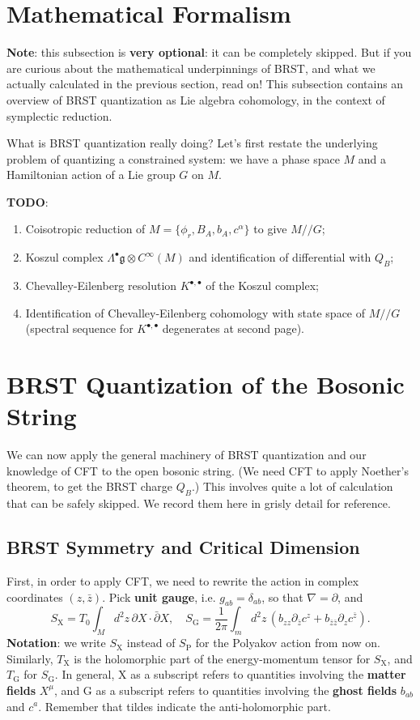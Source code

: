 \documentclass{report}
\theoremstyle{plain}
\theoremstyle{definition}
\theoremstyle{remark}
\newcommand{\di}{\partial}
\newcommand{\fg}{\mathfrak{g}}
\newcommand{\bz}{\bar{z}}
\begin{document}
\section{Mathematical Formalism}

{\bf Note}: this subsection is {\bf very optional}: it can be
completely skipped. But if you are curious about the mathematical
underpinnings of BRST, and what we actually calculated in the previous
section, read on! This subsection contains an overview of BRST
quantization as Lie algebra cohomology, in the context of symplectic
reduction.

What is BRST quantization really doing? Let's first restate the
underlying problem of quantizing a constrained system: we have a phase
space $M$ and a Hamiltonian action of a Lie group $G$ on $M$.

{\color{blue} \bf TODO}:
\begin{enumerate}
\item Coisotropic reduction of $M = \{\phi_r, B_A, b_A, c^\alpha\}$ to
  give $M//G$;
\item Koszul complex $\Lambda^\bullet \fg \otimes C^\infty(M)$ and
  identification of differential with $Q_B$;
\item Chevalley-Eilenberg resolution $K^{\bullet,\bullet}$ of the
  Koszul complex;
\item Identification of Chevalley-Eilenberg cohomology with state
  space of $M//G$ (spectral sequence for $K^{\bullet,\bullet}$
  degenerates at second page).
\end{enumerate}

\section{BRST Quantization of the Bosonic String}

We can now apply the general machinery of BRST quantization and our
knowledge of CFT to the open bosonic string. (We need CFT to apply
Noether's theorem, to get the BRST charge $Q_B$.) This involves quite
a lot of calculation that can be safely skipped. We record them here
in grisly detail for reference.

\subsection{BRST Symmetry and Critical Dimension}

First, in order to apply CFT, we need to rewrite the action in complex
coordinates $(z, \bz)$. Pick {\bf unit gauge}, i.e. $g_{ab} =
\delta_{ab}$, so that $\nabla = \di$, and
\[ S_{\text{X}} = T_0 \int_M d^2z \, \di X \cdot \bar{\di} X, \quad S_{\text{G}} = \frac{1}{2\pi} \int_m d^2z \, \left(b_{zz} \di_{\bz} c^z + b_{\bz\bz} \di_z c^{\bz}\right). \]
{\bf Notation}: we write $S_{\text{X}}$ instead of $S_{\text{P}}$ for
the Polyakov action from now on. Similarly, $T_{\text{X}}$ is the
holomorphic part of the energy-momentum tensor for $S_{\text{X}}$, and
$T_{\text{G}}$ for $S_{\text{G}}$. In general, X as a subscript refers
to quantities involving the {\bf matter fields} $X^\mu$, and G as a
subscript refers to quantities involving the {\bf ghost fields}
$b_{ab}$ and $c^a$. Remember that tildes indicate the anti-holomorphic
part.
\end{document}
